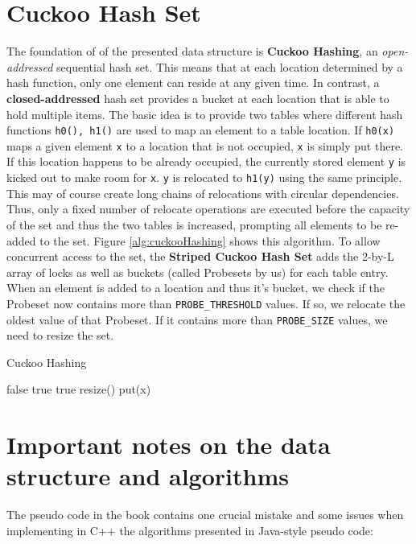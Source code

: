 \documentclass[a4paper,10pt]{article}
\begin{document}
\section{Cuckoo Hash Set}
The foundation of of the presented data structure is \textbf{Cuckoo Hashing}, an \textit{open-addressed} sequential hash set. This means that at each location determined by a hash function, only one element can reside at any given time. In contrast, a \textbf{closed-addressed} hash set provides a bucket at each location that is able to hold multiple items.
\newline
The basic idea is to provide two tables where different hash functions \lstinline|h0(), h1()| are used to map an element to a table location. If \lstinline|h0(x)| maps a given element \lstinline|x| to a location that is not occupied, \lstinline|x| is simply put there. If this location happens to be already occupied, the currently stored element \lstinline|y| is kicked out to make room for \lstinline|x|. \lstinline|y| is relocated to \lstinline|h1(y)| using the same principle. This may of course create long chains of relocations with circular dependencies. Thus, only a fixed number of relocate operations are executed before the capacity of the set and thus the two tables is increased, prompting all elements to be re-added to the set.
Figure \ref{alg:cuckooHashing} shows this algorithm.
\medskip
\newline
To allow concurrent access to the set, the \textbf{Striped Cuckoo Hash Set} adds the 2-by-L array of locks as well as buckets (called Probesets by us) for each table entry. When an element is added to a location and thus it's bucket, we check if the Probeset now contains more than \lstinline|PROBE_THRESHOLD| values. If so, we relocate the oldest value of that Probeset. If it contains more than \lstinline|PROBE_SIZE| values, we need to resize the set.

\begin{algorithm}
\caption{Cuckoo Hashing}
\label{alg:cuckooHashing}
\begin{algorithmic}[5]
		\State \Return false
	\EndIf
			\State \Return true
			\State \Return true
		\EndIf
	\EndFor
	\State resize()
	\State put(x)
\EndFunction
\end{algorithmic}
\end{algorithm}

\section{Important notes on the data structure and algorithms}
\label{sec:implDetails}
The pseudo code in the book contains one crucial mistake and some issues when implementing in C++ the algorithms presented in Java-style pseudo code:
\end{document}
